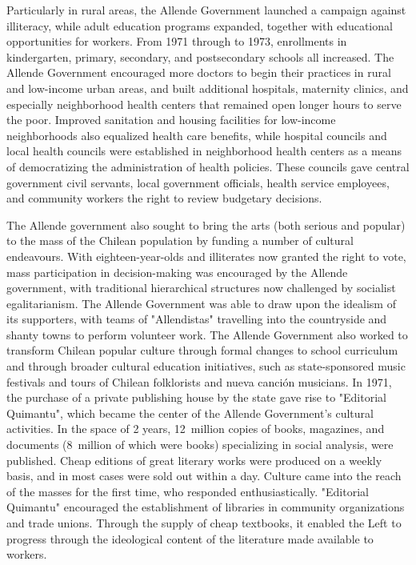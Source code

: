 Particularly in rural areas, the Allende Government launched a campaign
against illiteracy, while adult education programs expanded, together
with educational opportunities for workers. From 1971 through to 1973,
enrollments in kindergarten, primary, secondary, and postsecondary
schools all increased. The Allende Government encouraged more doctors to
begin their practices in rural and low-income urban areas, and built
additional hospitals, maternity clinics, and especially neighborhood
health centers that remained open longer hours to serve the poor.
Improved sanitation and housing facilities for low-income neighborhoods
also equalized health care benefits, while hospital councils and local
health councils were established in neighborhood health centers as a
means of democratizing the administration of health policies. These
councils gave central government civil servants, local government
officials, health service employees, and community workers the right to
review budgetary decisions.

The Allende government also sought to bring the arts (both serious and
popular) to the mass of the Chilean population by funding a number of
cultural endeavours. With eighteen-year-olds and illiterates now granted
the right to vote, mass participation in decision-making was encouraged
by the Allende government, with traditional hierarchical structures now
challenged by socialist egalitarianism. The Allende Government was able
to draw upon the idealism of its supporters, with teams of "Allendistas"
travelling into the countryside and shanty towns to perform volunteer
work. The Allende Government also worked to transform Chilean popular
culture through formal changes to school curriculum and through broader
cultural education initiatives, such as state-sponsored music festivals
and tours of Chilean folklorists and nueva canción musicians. In 1971,
the purchase of a private publishing house by the state gave rise to
"Editorial Quimantu", which became the center of the Allende
Government's cultural activities. In the space of 2 years, 12~million
copies of books, magazines, and documents (8~million of which were
books) specializing in social analysis, were published. Cheap editions
of great literary works were produced on a weekly basis, and in most
cases were sold out within a day. Culture came into the reach of the
masses for the first time, who responded enthusiastically. "Editorial
Quimantu" encouraged the establishment of libraries in community
organizations and trade unions. Through the supply of cheap textbooks,
it enabled the Left to progress through the ideological content of the
literature made available to workers.

